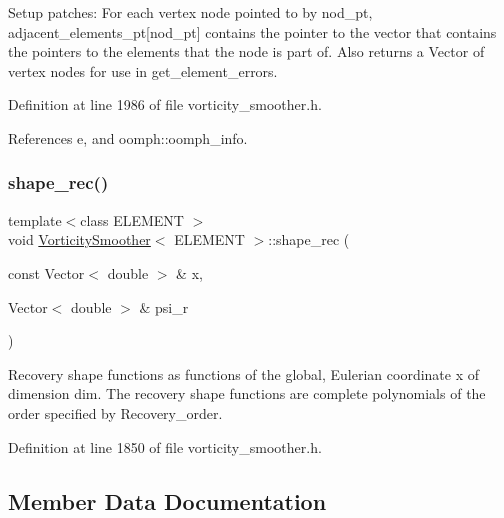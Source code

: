 Setup patches\+: For each vertex node pointed to by nod\+\_\+pt, adjacent\+\_\+elements\+\_\+pt\mbox{[}nod\+\_\+pt\mbox{]} contains the pointer to the vector that contains the pointers to the elements that the node is part of. Also returns a Vector of vertex nodes for use in get\+\_\+element\+\_\+errors. 



Definition at line 1986 of file vorticity\+\_\+smoother.\+h.



References e, and oomph\+::oomph\+\_\+info.

\mbox{\label{classVorticitySmoother_a16d8a464f8285c17dfdf82a081e28783}} 
\subsubsection{\texorpdfstring{shape\+\_\+rec()}{shape\_rec()}}
{\footnotesize\ttfamily template$<$class E\+L\+E\+M\+E\+NT $>$ \\
void \hyperlink{classVorticitySmoother}{Vorticity\+Smoother}$<$ E\+L\+E\+M\+E\+NT $>$\+::shape\+\_\+rec (\begin{DoxyParamCaption}\item[{const Vector$<$ double $>$ \&}]{x,  }\item[{Vector$<$ double $>$ \&}]{psi\+\_\+r }\end{DoxyParamCaption})\hspace{0.3cm}{\ttfamily [inline]}}



Recovery shape functions as functions of the global, Eulerian coordinate x of dimension dim. The recovery shape functions are complete polynomials of the order specified by Recovery\+\_\+order. 



Definition at line 1850 of file vorticity\+\_\+smoother.\+h.



\subsection{Member Data Documentation}
\mbox{\label{classVorticitySmoother_ab7d4c2895687d645f42694d2008b8efe}} 
